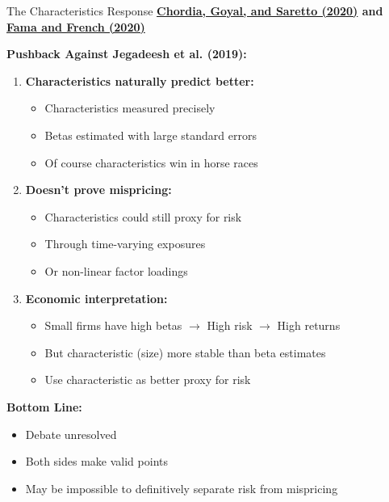 \documentclass{beamer}
\begin{document}
\begin{frame}{The Characteristics Response}
    \textbf{\textcolor{blue}{\href{https://doi.org/10.1093/rfs/hhaa018}{Chordia, Goyal, and Saretto (2020)}} and \textcolor{blue}{\href{https://doi.org/10.1093/rfs/hhz089}{Fama and French (2020)}}}
    
    
    \textbf{Pushback Against Jegadeesh et al. (2019):}
    \begin{enumerate}
        \item \textbf{Characteristics naturally predict better:}
        \begin{itemize}
            \item Characteristics measured precisely
            \item Betas estimated with large standard errors
            \item Of course characteristics win in horse races
        \end{itemize}
        
        \item \textbf{Doesn't prove mispricing:}
        \begin{itemize}
            \item Characteristics could still proxy for risk
            \item Through time-varying exposures
            \item Or non-linear factor loadings
        \end{itemize}
        
        \item \textbf{Economic interpretation:}
        \begin{itemize}
            \item Small firms have high betas $\rightarrow$ High risk $\rightarrow$ High returns
            \item But characteristic (size) more stable than beta estimates
            \item Use characteristic as better proxy for risk
        \end{itemize}
    \end{enumerate}
    
    
    \textbf{Bottom Line:}
    \begin{itemize}
        \item Debate unresolved
        \item Both sides make valid points
        \item May be impossible to definitively separate risk from mispricing
    \end{itemize}
\end{frame}
\end{document}
